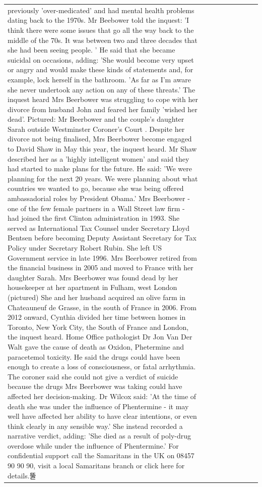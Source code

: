 \begin{table}[H]
\begin{tabular}{lllrlllll}
previously 'over-medicated' and had mental health problems dating back to the 1970s. Mr Beebower told the inquest: 'I think there were some issues that go all the way back to the middle of the 70s. It was between two and three decades that she had been seeing people. ' He said that she became suicidal on occasions, adding: 'She would become very upset or angry and would make these kinds of statements and, for example, lock herself in the bathroom. 'As far as I'm aware she never undertook any action on any of these threats.' The inquest heard Mrs Beerbower was struggling to cope with her divorce from husband John and feared her family 'wished her dead'. Pictured: Mr Beerbower and the couple's daughter Sarah outside Westminster Coroner's Court . Despite her divorce not being finalised, Mrs Beerbower become engaged to David Shaw in May this year, the inquest heard. Mr Shaw described her as a 'highly intelligent women' and said they had started to make plans for the future. He said: 'We were planning for the next 20 years. We were planning about what countries we wanted to go, because she was being offered ambassadorial roles by President Obama.' Mrs Beerbower - one of the few female partners in a Wall Street law firm - had joined the first Clinton administration in 1993. She served as International Tax Counsel under Secretary Lloyd Bentsen before becoming Deputy Assistant Secretary for Tax Policy under Secretary Robert Rubin. She left US Government service in late 1996. Mrs Beerbower retired from the financial business in 2005 and moved to France with her daughter Sarah. Mrs Beerbower was found dead by her housekeeper at her apartment in Fulham, west London (pictured) She and her husband acquired an olive farm in Chateauneuf de Grasse, in the south of France in 2006. From 2012 onward, Cynthia divided her time between homes in Toronto, New York City, the South of France and London, the inquest heard. Home Office pathologist Dr Jon Van Der Walt gave the cause of death as Oxidon, Phetermine and paracetemol toxicity. He said the drugs could have been enough to create a loss of consciousness, or fatal arrhythmia. The coroner said she could not give a verdict of suicide because the drugs Mrs Beerbower was taking could have affected her decision-making. Dr Wilcox said: 'At the time of death she was under the influence of Phentermine - it may well have affected her ability to have clear intentions, or even think clearly in any sensible way.' She instead recorded a narrative verdict, adding: 'She died as a result of poly-drug overdose while under the influence of Phentermine.' For confidential support call the Samaritans in the UK on 08457 90 90 90, visit a local Samaritans branch or click here for details.뚤 \\

\end{tabular}
\end{table}
